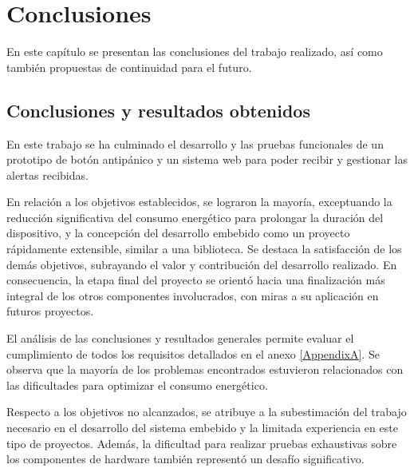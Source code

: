 
\chapter{Conclusiones} %

\label{Chapter5} %

En este capítulo se presentan las conclusiones del trabajo realizado, así como también propuestas de continuidad para el futuro.


\section{Conclusiones y resultados obtenidos}

En este trabajo se ha culminado el desarrollo y las pruebas funcionales de un prototipo de botón antipánico y un sistema web para poder recibir y gestionar las alertas recibidas.

En relación a los objetivos establecidos, se lograron la mayoría, exceptuando la reducción significativa del consumo energético para prolongar la duración del dispositivo, y la concepción del desarrollo embebido como un proyecto rápidamente extensible, similar a una biblioteca. Se destaca la satisfacción de los demás objetivos, subrayando el valor y contribución del desarrollo realizado. En consecuencia, la etapa final del proyecto se orientó hacia una finalización más integral de los otros componentes involucrados, con miras a su aplicación en futuros proyectos.

El análisis de las conclusiones y resultados generales permite evaluar el cumplimiento de todos los requisitos detallados en el anexo \ref{AppendixA}. Se observa que la mayoría de los problemas encontrados estuvieron relacionados con las dificultades para optimizar el consumo energético. 

Respecto a los objetivos no alcanzados, se atribuye a la subestimación del trabajo necesario en el desarrollo del sistema embebido y la limitada experiencia en este tipo de proyectos. Además, la dificultad para realizar pruebas exhaustivas sobre los componentes de hardware también representó un desafío significativo.

